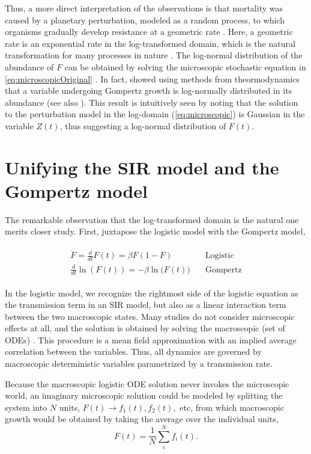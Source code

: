 \documentclass[review]{elsarticle}
\begin{document}
Thus, a more direct interpretation of the observations is that mortality was caused by a planetary perturbation, modeled as a random process, to which organisms gradually develop resistance at a geometric rate \citep{boxenbaum2017hypotheses,neafsey1988gompertz}. Here, a geometric rate is an exponential rate in the log-transformed domain, which is the natural transformation for many processes in nature \citep{zhang1994log}. The log-normal distribution of the abundance of $F$ can be obtained by solving the microscopic stochastic equation in \ref{eq:microscopicOriginal} \citep{skiadas2010exact,petroni2020gompertz}. In fact, \citet{sitaram1984statistical} showed using methods from theormodynamics that a variable undergoing Gompertz growth is log-normally distributed in its abundance (see also \citet{gunasekaran1982lon}). This result is intuitively seen by noting that the solution to the perturbation model in the log-domain (\ref{eq:microscopic}) is Gaussian in the variable $Z(t)$, thus suggesting a log-normal distribution of $F(t)$. 

\section{Unifying the SIR model and the Gompertz model}
The remarkable observation that the log-transformed domain is the natural one merits closer study. First, juxtapose the logistic model with the Gompertz model,

\begin{align}
\label{eq:compare}
\begin{split}
\dot{F} = \frac{d}{dt}F(t) = \beta F (1-F) \quad&\quad \text{Logistic}\\ 
\frac{d}{dt}\ln{(F(t))} = -\beta \ln{(F(t)}) &\quad \text{Gompertz}
\end{split}
\end{align}

In the logistic model, we recognize the rightmost side of the logistic equation as the transmission term in an SIR model, but also as a linear interaction term between the two macroscopic states. Many studies do not consider microscopic effects at all, and the solution is obtained by solving the macroscopic (set of ODEs) \citep{vattay2020forecasting}.
This procedure is a mean field approximation with an implied average correlation between the variables. 
Thus, all dynamics are governed by macroscopic deterministic variables parametrized by a transmission rate.

Because the macroscopic logistic ODE solution never invokes the microscopic world, an imaginary microscopic solution could be modeled by splitting the system into $N$ units, $F(t) \rightarrow f_1(t), f_2(t),$ etc, from which macroscopic growth would be obtained by taking the average over the individual units,
\begin{equation}
F(t) = \frac{1}{N}\sum_i^N f_i(t).
\end{equation}
\end{document}

